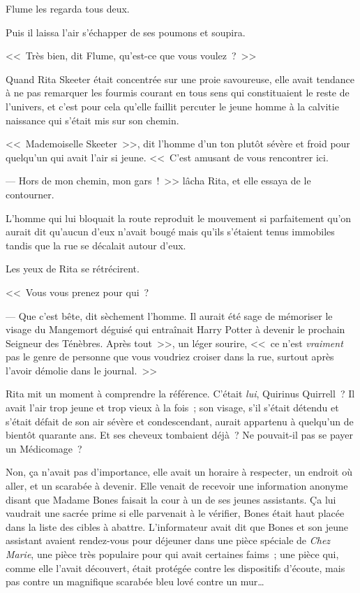 Flume les regarda tous deux.

Puis il laissa l'air s'échapper de ses poumons et soupira.

<<~Très bien, dit Flume, qu'est-ce que vous voulez~?~>>


Quand Rita Skeeter était concentrée sur une proie savoureuse, elle avait tendance à ne pas remarquer les fourmis courant en tous sens qui constituaient le reste de l'univers, et c'est pour cela qu'elle faillit percuter le jeune homme à la calvitie naissance qui s'était mis sur son chemin.

<<~Mademoiselle Skeeter~>>, dit l'homme d'un ton plutôt sévère et froid pour quelqu'un qui avait l'air si jeune. <<~C'est amusant de vous rencontrer ici.

--- Hors de mon chemin, mon gars~!~>> lâcha Rita, et elle essaya de le contourner.

L'homme qui lui bloquait la route reproduit le mouvement si parfaitement qu'on aurait dit qu'aucun d'eux n'avait bougé mais qu'ils s'étaient tenus immobiles tandis que la rue se décalait autour d'eux.

Les yeux de Rita se rétrécirent.

<<~Vous vous prenez pour qui~?

--- Que c'est bête, dit sèchement l'homme. Il aurait été sage de mémoriser le visage du Mangemort déguisé qui entraînait Harry Potter à devenir le prochain Seigneur des Ténèbres. Après tout~>>, un léger sourire, <<~ce n'est \emph{vraiment} pas le genre de personne que vous voudriez croiser dans la rue, surtout après l'avoir démolie dans le journal.~>>

Rita mit un moment à comprendre la référence. C'était \emph{lui}, Quirinus Quirrell~? Il avait l'air trop jeune et trop vieux à la fois~; son visage, s'il s'était détendu et s'était défait de son air sévère et condescendant, aurait appartenu à quelqu'un de bientôt quarante ans. Et ses cheveux tombaient déjà~? Ne pouvait-il pas se payer un Médicomage~?

Non, ça n'avait pas d'importance, elle avait un horaire à respecter, un endroit où aller, et un scarabée à devenir. Elle venait de recevoir une information anonyme disant que Madame Bones faisait la cour à un de ses jeunes assistants. Ça lui vaudrait une sacrée prime si elle parvenait à le vérifier, Bones était haut placée dans la liste des cibles à abattre. L'informateur avait dit que Bones et son jeune assistant avaient rendez-vous pour déjeuner dans une pièce spéciale de \emph{Chez Marie}, une pièce très populaire pour qui avait certaines faims~; une pièce qui, comme elle l'avait découvert, était protégée contre les dispositifs d'écoute, mais pas contre un magnifique scarabée bleu lové contre un mur…

